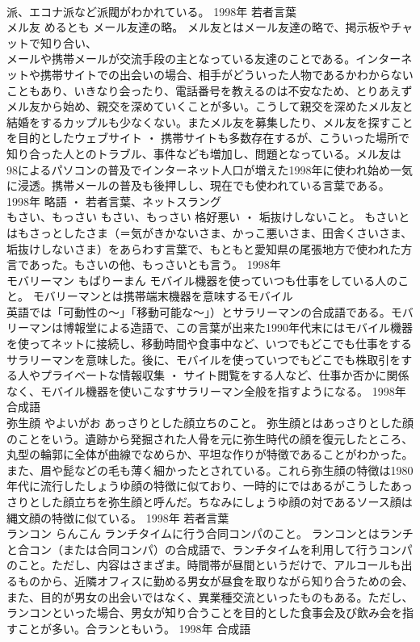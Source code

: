 \documentclass[8pt]{extreport}
\begin{document}
\begin{CJK}{UTF8}{min}
\\	派、エコナ派など派閥がわかれている。	1998年	若者言葉	
\\	メル友	めるとも	メール友達の略。	メル友とはメール友達の略で、掲示板やチャットで知り合い、
\\	メールや携帯メールが交流手段の主となっている友達のことである。インターネットや携帯サイトでの出会いの場合、相手がどういった人物であるかわからないこともあり、いきなり会ったり、電話番号を教えるのは不安なため、とりあえずメル友から始め、親交を深めていくことが多い。こうして親交を深めたメル友と結婚をするカップルも少なくない。またメル友を募集したり、メル友を探すことを目的としたウェブサイト ・ 携帯サイトも多数存在するが、こういった場所で知り合った人とのトラブル、事件なども増加し、問題となっている。メル友は
\\	98によるパソコンの普及でインターネット人口が増えた1998年に使われ始め一気に浸透。携帯メールの普及も後押しし、現在でも使われている言葉である。	1998年	略語 ・ 若者言葉、ネットスラング	
\\	もさい、もっさい	もさい、もっさい	格好悪い ・ 垢抜けしないこと。	もさいとはもさっとしたさま（＝気がきかないさま、かっこ悪いさま、田舎くさいさま、垢抜けしないさま）をあらわす言葉で、もともと愛知県の尾張地方で使われた方言であった。もさいの他、もっさいとも言う。	1998年	
\\	モバリーマン	もばりーまん	モバイル機器を使っていつも仕事をしている人のこと。	モバリーマンとは携帯端末機器を意味するモバイル
\\	英語では「可動性の～」「移動可能な～」）とサラリーマンの合成語である。モバリーマンは博報堂による造語で、この言葉が出来た1990年代末にはモバイル機器を使ってネットに接続し、移動時間や食事中など、いつでもどこでも仕事をするサラリーマンを意味した。後に、モバイルを使っていつでもどこでも株取引をする人やプライベートな情報収集 ・ サイト閲覧をする人など、仕事か否かに関係なく、モバイル機器を使いこなすサラリーマン全般を指すようになる。	1998年	合成語	
\\	弥生顔	やよいがお	あっさりとした顔立ちのこと。	弥生顔とはあっさりとした顔のことをいう。遺跡から発掘された人骨を元に弥生時代の顔を復元したところ、丸型の輪郭に全体が曲線でなめらか、平坦な作りが特徴であることがわかった。また、眉や髭などの毛も薄く細かったとされている。これら弥生顔の特徴は1980年代に流行したしょうゆ顔の特徴に似ており、一時的にではあるがこうしたあっさりとした顔立ちを弥生顔と呼んだ。ちなみにしょうゆ顔の対であるソース顔は縄文顔の特徴に似ている。	1998年	若者言葉	
\\	ランコン	らんこん	ランチタイムに行う合同コンパのこと。	ランコンとはランチと合コン（または合同コンパ）の合成語で、ランチタイムを利用して行うコンパのこと。ただし、内容はさまざま。時間帯が昼間というだけで、アルコールも出るものから、近隣オフィスに勤める男女が昼食を取りながら知り合うための会、また、目的が男女の出会いではなく、異業種交流といったものもある。ただし、ランコンといった場合、男女が知り合うことを目的とした食事会及び飲み会を指すことが多い。合ランともいう。	1998年	合成語	

\end{CJK}
\end{document}
